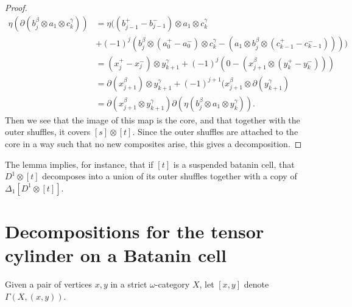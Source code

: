 \documentclass[10pt]{amsart}
\numberwithin{equation}{section}
\theoremstyle{plain}   %
\theoremstyle{remark}
\theoremstyle{plain}
\begin{document}
\begin{proof}
\begin{align*}
\eta(\partial(b_j^\beta \otimes a_1\otimes c_k^\gamma))&= \eta((b_{j-1}^+ - b_{j-1}^-) \otimes a_1 \otimes c_k^\gamma \\&+(-1)^j ( b_j^\beta \otimes (a_0^+ - a_0^-)\otimes c_k^\gamma -(a_1\otimes b_j^\beta \otimes (c_{k-1}^+ - c_{k-1}^-)))) 
\\&= (x_j^+ - x_j^-) \otimes y_{k+1}^\gamma + (-1)^{j}(0-(x^\beta_{j+1}\otimes (y^+_k-y^-_k))) \\&= \partial(x_{j+1}^\beta) \otimes y^\gamma_{k+1} + (-1)^{j+1}(x^\beta_{j+1} \otimes \partial(y^\gamma_{k+1})\\&=\partial(x_{j+1}^\beta \otimes y^\gamma_{k+1})\partial(\eta(b^\beta_j \otimes a_1 \otimes y^\gamma_k)).  
\end{align*}
Then we see that the image of this map is the core, and that together with the outer shuffles, it covers \([s]\otimes [t]\).  Since the outer shuffles are attached to the core in a way such that no new composites arise, this gives a decomposition.
\end{proof}

The lemma implies, for instance, that if \([t]\) is a suspended batanin cell, that \(D^1\otimes [t]\) decomposes into a union of its outer shuffles together with a copy of \(\Delta_1[D^1\otimes [t]]\).  

\section{Decompositions for the tensor cylinder on a Batanin cell}

Given a pair of vertices \(x,y\) in a strict \(\omega\)-category \(X\), let \([x,y]\) denote \(\Gamma(X,(x,y))\). 
\end{document}
